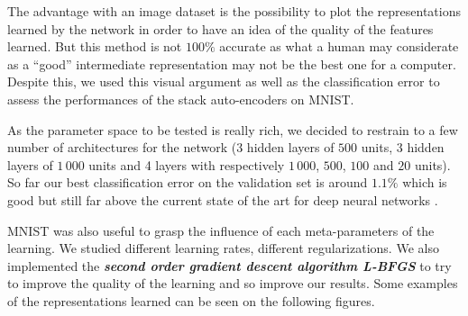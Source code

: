 \documentclass[a4paper,11pt]{report}
\newcommand{\Important}[1]{\textbf{{\em #1}}}
\begin{document}
		The advantage with an image dataset is the possibility to plot the representations learned by the network in order to have an idea of the quality of the features learned. But this method is not $100\%$ accurate as what a human may considerate as a ``good'' intermediate representation may not be the best one for a computer. Despite this, we used this visual argument as well as the classification error to assess the performances of the stack auto-encoders on MNIST.\\\par
		
		As the parameter space to be tested is really rich, we decided to restrain to a few number of architectures for the network (3 hidden layers of $500$ units, 3 hidden layers of $1\,000$ units and 4 layers with respectively $1\,000$, $500$, $100$ and $20$ units). So far our best classification error on the validation set is around $1.1\%$ which is good but still far above the current state of the art for deep neural networks \cite{LeCun_webPage}.\\\par
		
		MNIST was also useful to grasp the influence of each meta-parameters of the learning. We studied different learning rates, different regularizations. We also implemented the \Important{second order gradient descent algorithm L-BFGS} to try to improve the quality of the learning and so improve our results. Some examples of the representations learned can be seen on the following figures.
		
\end{document}
